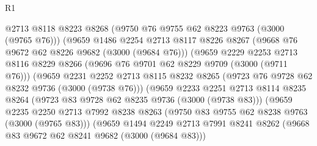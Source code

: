 \begin{lexlean}{R1}
\begin{coremodule}
                                @2713
                                @8118
                                @8223
                                @8268
                                (@9750 @76 @9755 @62 @8223 @9763 (@3000 (@9765 @76)))
                                (@9659
                                  @1486
                                  @2254
                                  @2713
                                  @8117
                                  @8226
                                  @8267
                                  (@9668 @76 @9672 @62 @8226 @9682 (@3000 (@9684 @76)))
                                  (@9659
                                    @2229
                                    @2253
                                    @2713
                                    @8116
                                    @8229
                                    @8266
                                    (@9696 @76 @9701 @62 @8229 @9709 (@3000 (@9711 @76)))
                                    (@9659
                                      @2231
                                      @2252
                                      @2713
                                      @8115
                                      @8232
                                      @8265
                                      (@9723 @76 @9728 @62 @8232 @9736 (@3000 (@9738 @76)))
                                      (@9659
                                        @2233
                                        @2251
                                        @2713
                                        @8114
                                        @8235
                                        @8264
                                        (@9723 @83 @9728 @62 @8235 @9736 (@3000 (@9738 @83)))
                                        (@9659
                                          @2235
                                          @2250
                                          @2713
                                          @7992
                                          @8238
                                          @8263
                                          (@9750 @83 @9755 @62 @8238 @9763 (@3000 (@9765 @83)))
                                          (@9659
                                            @1494
                                            @2249
                                            @2713
                                            @7991
                                            @8241
                                            @8262
                                            (@9668 @83 @9672 @62 @8241 @9682 (@3000 (@9684 @83)))

\end{coremodule}
\end{lexlean}
